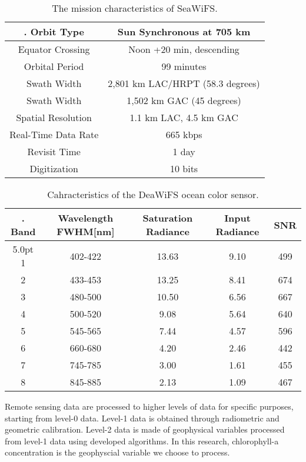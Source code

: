 \begin{table}[h]%
 	\caption{The mission characteristics of SeaWiFS.}
 	\label{table01}
 	\centering
 	\begin{tabular}{c|c}
 		\hline \setlength{\arrayrulewidth}{0.8pt}. 
 	Orbit Type	& Sun Synchronous at 705 km \\ \hline
 	Equator Crossing &	Noon +20 min, descending \\ \hline
 	Orbital Period &	99 minutes  \\ \hline
 	Swath Width &	2,801 km LAC/HRPT (58.3 degrees)  \\ \hline
 	Swath Width &	1,502 km GAC (45 degrees)  \\ \hline
 	Spatial Resolution &	1.1 km LAC, 4.5 km GAC  \\ \hline
 	Real-Time Data Rate &	665 kbps  \\ \hline
 	Revisit Time &	1 day  \\ \hline
 	Digitization &	10 bits  \\ \hline
 	\end{tabular}
 \end{table}

 \begin{table}[h]%
	\caption{Cahracteristics of the DeaWiFS ocean color sensor.}
	\label{table02}
	\centering
	\begin{tabular}{c|c|c|c|c}
		\hline \setlength{\arrayrulewidth}{0.8pt}. 
		Band	& Wavelength FWHM[nm] & Saturation Radiance & Input Radiance & SNR\\ \hline{5.0pt}
		1 & 402-422 & 13.63 & 9.10 & 499 \\ \hline
		2 & 433-453 & 13.25 & 8.41 & 674  \\ \hline
		3 & 480-500 & 10.50 & 6.56 & 667 \\ \hline
		4 & 500-520 & 9.08 & 5.64 & 640  \\ \hline
		5 & 545-565 & 7.44 & 4.57 & 596 \\ \hline
		6 & 660-680 & 4.20 & 2.46 & 442  \\ \hline
		7 & 745-785 & 3.00 & 1.61 & 455 \\ \hline
		8 & 845-885 & 2.13 & 1.09 & 467  \\ \hline
	\end{tabular}
\end{table}
 

 Remote sensing data are processed to higher levels of data for specific purposes, starting from level-0 data. Level-1 data is obtained through radiometric and geometric calibration. Level-2 data is made of geophysical variables processed from level-1 data using developed algorithms. In this research, chlorophyll-a concentration is the geophyscial variable we choose to process. 
 
